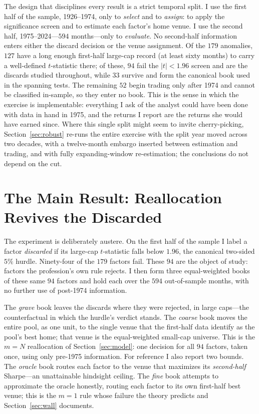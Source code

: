 \documentclass[12pt]{article}
\theoremstyle{plain}
\theoremstyle{definition}
\begin{document}
The design that disciplines every result is a strict temporal split. I use the
first half of the sample, 1926--1974, only to \emph{select} and to \emph{assign}:
to apply the significance screen and to estimate each factor's home venue. I use
the second half, 1975--2024---$594$ months---only to \emph{evaluate}. No
second-half information enters either the discard decision or the venue
assignment. Of the $179$ anomalies, $127$ have a long enough first-half
large-cap record (at least sixty months) to carry a well-defined $t$-statistic
there; of these, $94$ fail the $|t|<1.96$ screen and are the discards studied
throughout, while $33$ survive and form the canonical book used in the spanning
tests. The remaining $52$ begin trading only after 1974 and cannot be classified
in-sample, so they enter no book. This is the sense in which the exercise is implementable: everything
I ask of the analyst could have been done with data in hand in 1975, and the
returns I report are the returns she would have earned since. Where this single
split might seem to invite cherry-picking, Section~\ref{sec:robust} re-runs the
entire exercise with the split year moved across two decades, with a
twelve-month embargo inserted between estimation and trading, and with fully
expanding-window re-estimation; the conclusions do not depend on the cut.

\section{The Main Result: Reallocation Revives the Discarded}
\label{sec:main}

The experiment is deliberately austere. On the first half of the sample I label a
factor \emph{discarded} if its large-cap $t$-statistic falls below $1.96$, the
canonical two-sided $5\%$ hurdle. Ninety-four of the $179$ factors fail. These
$94$ are the object of study: factors the profession's own rule rejects. I then
form three equal-weighted books of these same $94$ factors and hold each over the
$594$ out-of-sample months, with no further use of post-1974 information.

The \emph{grave} book leaves the discards where they were rejected, in large
caps---the counterfactual in which the hurdle's verdict stands. The \emph{coarse}
book moves the entire pool, as one unit, to the single venue that the first-half
data identify as the pool's best home; that venue is the equal-weighted
small-cap universe. This is the $m=N$ reallocation of Section~\ref{sec:model}: one
decision for all $94$ factors, taken once, using only pre-1975 information. For
reference I also report two bounds. The \emph{oracle} book routes each factor to
the venue that maximizes its \emph{second-half} Sharpe---an unattainable
hindsight ceiling. The \emph{fine} book attempts to approximate the oracle
honestly, routing each factor to its own first-half best venue; this is the
$m=1$ rule whose failure the theory predicts and Section~\ref{sec:wall}
documents.
\end{document}
